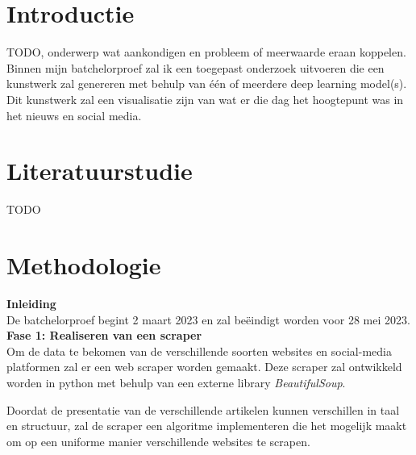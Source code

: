 
\section{Introductie}%
\label{sec:introductie}
\noindent
TODO, onderwerp wat aankondigen en probleem of meerwaarde  eraan koppelen. \\
\noindent
Binnen mijn batchelorproef zal ik een toegepast onderzoek uitvoeren die een kunstwerk zal genereren met behulp van één of meerdere deep learning model(s).
Dit kunstwerk zal een visualisatie zijn van wat er die dag het hoogtepunt was in het nieuws en social media.



\section{Literatuurstudie}%
 TODO



\section{Methodologie}%
\label{sec:methodologie}
\noindent
\textbf{Inleiding} \\
De batchelorproef begint 2 maart 2023 en zal beëindigt worden voor 28 mei 2023. \\

\noindent
\textbf{Fase 1: Realiseren van een scraper} \\
Om de data te bekomen van de verschillende soorten websites en social-media platformen zal er een web scraper worden gemaakt. Deze scraper zal ontwikkeld worden in python met behulp van een externe library \emph{BeautifulSoup}.

\noindent
Doordat de presentatie van de verschillende artikelen kunnen verschillen in taal en structuur, zal de scraper een algoritme implementeren die het mogelijk maakt om op een uniforme manier verschillende websites te scrapen. \\

